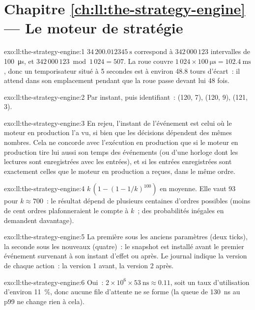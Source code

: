 \section*{Chapitre \ref{ch:ll:the-strategy-engine} --- Le moteur de stratégie}

\begin{solution}{exo:ll:the-strategy-engine:1}
$34\,200.012345~\text{s}$ correspond à $342\,000\,123$ intervalles de \qty{100}{\micro\second}, et $342\,000\,123 \bmod 1\,024 = 507$. La
roue couvre $1\,024 \times \qty{100}{\micro\second} = \qty{102.4}{\milli\second}$, donc un temporisateur situé à 5 secondes est à environ 48.8
tours d'écart~: il attend dans son emplacement pendant que la roue passe devant lui 48 fois.
\end{solution}

\begin{solution}{exo:ll:the-strategy-engine:2}
Par instant, puis identifiant~: (120, 7), (120, 9), (121, 3).
\end{solution}

\begin{solution}{exo:ll:the-strategy-engine:3}
En rejeu, l'instant de l'événement est celui où le moteur en production l'a vu, si bien que les décisions dépendent des mêmes nombres. Cela ne concorde avec l'exécution en production que
si le moteur en production tire lui aussi son temps des événements (ou d'une horloge dont les lectures sont enregistrées avec les entrées), et si
les entrées enregistrées sont exactement celles que le moteur en production a reçues, dans le même ordre.
\end{solution}

\begin{solution}{exo:ll:the-strategy-engine:4}
$k\,(1 - (1 - 1/k)^{100})$ en moyenne. Elle vaut 93 pour $k \approx 700$~: le résultat dépend de plusieurs centaines
d'ordres possibles (moins de cent ordres plafonneraient le compte à $k$~; des probabilités inégales en demandent davantage).
\end{solution}

\begin{solution}{exo:ll:the-strategy-engine:5}
La première sous les anciens paramètres (deux ticks), la seconde sous les nouveaux (quatre)~: le snapshot est installé avant le premier
événement survenant à son instant d'effet ou après. Le journal indique la version de chaque action~: la version 1 avant, la version 2 après.
\end{solution}

\begin{solution}{exo:ll:the-strategy-engine:6}
Oui~: $2 \times 10^6 \times \qty{53}{\nano\second} \approx 0.11$, soit un taux d'utilisation d'environ 11~\%, donc aucune file d'attente ne se forme (la queue
de \qty{130}{\nano\second} au p99 ne change rien à cela).
\end{solution}

